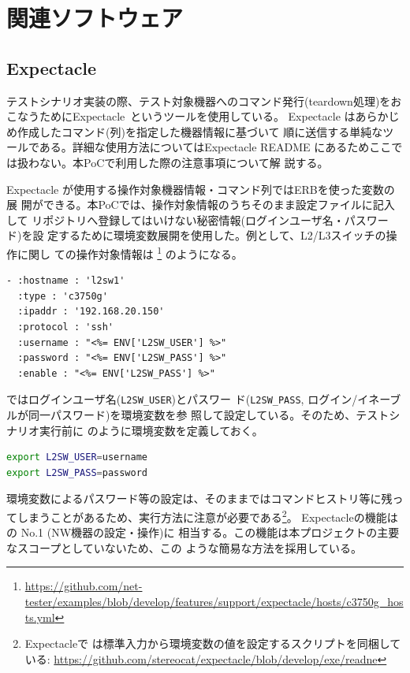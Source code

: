 
\chapter{関連ソフトウェア}

 \section{Expectacle}
 \label{sec:expectacle}

テストシナリオ実装の際、テスト対象機器へのコマンド発行(teardown処理)をお
こなうためにExpectacle~\cite{expectacle}というツールを使用している。
Expectacle はあらかじめ作成したコマンド(列)を指定した機器情報に基づいて
順に送信する単純なツールである。詳細な使用方法についてはExpectacle
README にあるためここでは扱わない。本PoCで利用した際の注意事項について解
説する。

Expectacle が使用する操作対象機器情報・コマンド列ではERBを使った変数の展
開ができる。本PoCでは、操作対象情報のうちそのまま設定ファイルに記入して
リポジトリへ登録してはいけない秘密情報(ログインユーザ名・パスワード)を設
定するために環境変数展開を使用した。例として、L2/L3スイッチの操作に関し
ての操作対象情報は
\footnote{\url{https://github.com/net-tester/examples/blob/develop/features/support/expectacle/hosts/c3750g_hosts.yml}}
のようになる。
\begin{lstlisting}[caption=L2スイッチ(L2SW1)ログイン情報,label=lst:l2sw1-login]
- :hostname : 'l2sw1'
  :type : 'c3750g'
  :ipaddr : '192.168.20.150'
  :protocol : 'ssh'
  :username : "<%= ENV['L2SW_USER'] %>"
  :password : "<%= ENV['L2SW_PASS'] %>"
  :enable : "<%= ENV['L2SW_PASS'] %>"
\end{lstlisting}
ではログインユーザ名(\verb|L2SW_USER|)とパスワー
ド(\verb|L2SW_PASS|, ログイン/イネーブルが同一パスワード)を環境変数を参
照して設定している。そのため、テストシナリオ実行前に
のように環境変数を定義しておく。
\begin{lstlisting}[language=sh,caption=ログイン情報環境変数の設定,label=lst:l2sw1-login-envvar]
export L2SW_USER=username
export L2SW_PASS=password
\end{lstlisting}

環境変数によるパスワード等の設定は、そのままではコマンドヒストリ等に残っ
てしまうことがあるため、実行方法に注意が必要である\footnote{Expectacleで
は標準入力から環境変数の値を設定するスクリプトを同梱している:
\url{https://github.com/stereocat/expectacle/blob/develop/exe/readne}}。
Expectacleの機能はの No.1 (NW機器の設定・操作)に
相当する。この機能は本プロジェクトの主要なスコープとしていないため、この
ような簡易な方法を採用している。

